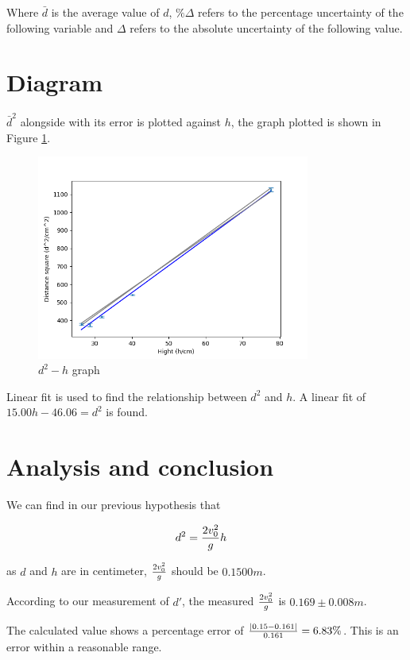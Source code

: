 \documentclass[a4paper]{article}
\begin{document}
Where $\bar{d}$ is the average value of $d$, $\%\Delta$ refers to the percentage uncertainty of the following variable and $\Delta$ refers to the absolute uncertainty of the following value.

\section{Diagram}

$\bar{d}^2$ alongside with its error is plotted against $h$, the graph plotted is shown in Figure \ref{fig.d2-h}.

\begin{figure}[h]
    \centering
    \includegraphics[width = 0.8\textwidth]{Figure_1.png}
    \caption{$d^2 - h$ graph}
    \label{fig.d2-h}
\end{figure}

Linear fit is used to find the relationship between $d^2$ and $h$. A linear fit of $15.00h - 46.06 = d^2$ is found. 

\section{Analysis and conclusion}

We can find in our previous hypothesis that

\begin{equation}
    \begin{aligned}
        & d^2 = {{2v_0^2}\over g}h
    \end{aligned}
\end{equation}

as $d$ and $h$ are in centimeter, ${2v_0^2}\over g$ should be $0.1500m$. 

According to our measurement of $d'$, the measured ${{2v_0^2}\over g}$ is $0.169 \pm 0.008m$.

The calculated value shows a percentage error of ${|0.15 - 0.161|\over 0.161} = 6.83\%$. This is an error within a reasonable range.
\end{document}
